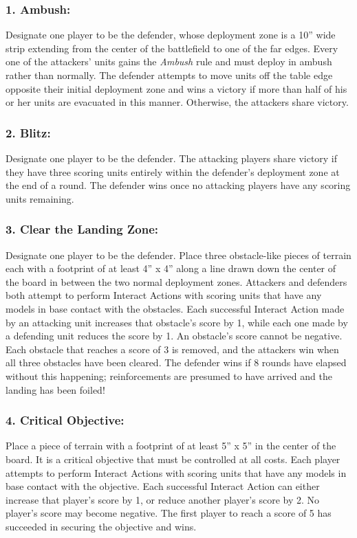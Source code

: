 \begin{multicols}{2}
\subsubsection*{1. Ambush:} Designate one player to be the defender, whose deployment zone is a 10'' wide strip extending from the center of the battlefield to one of the far edges. Every one of the attackers' units gains the \textit{Ambush} rule and must deploy in ambush rather than normally. The defender attempts to move units off the table edge opposite their initial deployment zone and wins a victory if more than half of his or her units are evacuated in this manner. Otherwise, the attackers share victory.

\subsubsection*{2. Blitz:} Designate one player to be the defender. The attacking players share victory if they have three scoring units entirely within the defender's deployment zone at the end of a round. The defender wins once no attacking players have any scoring units remaining.

\subsubsection*{3. Clear the Landing Zone:} Designate one player to be the defender. Place three obstacle-like pieces of terrain each with a footprint of at least 4'' x 4'' along a line drawn down the center of the board in between the two normal deployment zones. Attackers and defenders both attempt to perform Interact Actions with scoring units that have any models in base contact with the obstacles. Each successful Interact Action made by an attacking unit increases that obstacle's score by 1, while each one made by a defending unit reduces the score by 1. An obstacle's score cannot be negative. Each obstacle that reaches a score of 3 is removed, and the attackers win when all three obstacles have been cleared. The defender wins if 8 rounds have elapsed without this happening; reinforcements are presumed to have arrived and the landing has been foiled!

\subsubsection*{4. Critical Objective:} Place a piece of terrain with a footprint of at least 5'' x 5'' in the center of the board. It is a critical objective that must be controlled at all costs. Each player attempts to perform Interact Actions with scoring units that have any models in base contact with the objective. Each successful Interact Action can either increase that player's score by 1, or reduce another player's score by 2. No player's score may become negative. The first player to reach a score of 5 has succeeded in securing the objective and wins.


\end{multicols}
